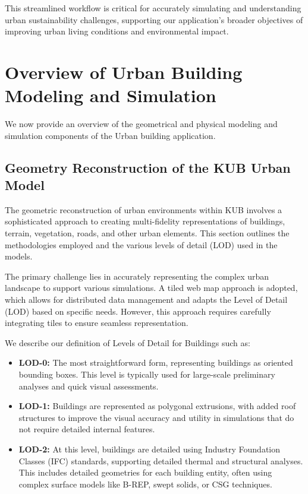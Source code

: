 \documentclass[runningheads]{llncs}
\begin{document}
This streamlined workflow is critical for accurately simulating and understanding urban sustainability challenges, supporting our application's broader objectives of improving urban living conditions and environmental impact.


\section{Overview of Urban Building Modeling and Simulation}

We now provide an overview of the geometrical and physical modeling and simulation components of the Urban building application.

\subsection{Geometry Reconstruction of the KUB Urban Model}

The geometric reconstruction of urban environments within KUB involves a sophisticated approach to creating multi-fidelity representations of buildings, terrain, vegetation, roads, and other urban elements. This section outlines the methodologies employed and the various levels of detail (LOD) used in the models.


The primary challenge lies in accurately representing the complex urban landscape to support various simulations. A tiled web map approach is adopted, which allows for distributed data management and adapts the Level of Detail (LOD) based on specific needs. However, this approach requires carefully integrating tiles to ensure seamless representation.


We describe our definition of Levels of Detail for Buildings such as:
\begin{itemize}
    \item \textbf{LOD-0:} The most straightforward form, representing buildings as oriented bounding boxes. This level is typically used for large-scale preliminary analyses and quick visual assessments.
    \item \textbf{LOD-1:} Buildings are represented as polygonal extrusions, with added roof structures to improve the visual accuracy and utility in simulations that do not require detailed internal features.
    \item \textbf{LOD-2:} At this level, buildings are detailed using Industry Foundation Classes (IFC) standards, supporting detailed thermal and structural analyses. This includes detailed geometries for each building entity, often using complex surface models like B-REP, swept solids, or CSG techniques.
\end{itemize}
\end{document}
